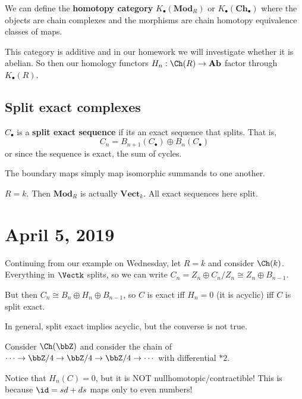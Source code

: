 \documentclass[12pt]{article}
\begin{document}
\begin{rmk}
	We can define the \textbf{homotopy category} $K_\bullet(\mathbf{Mod}_R)$ or $K_\bullet(\mathbf{Ch}_\bullet)$
	where the objects are chain complexes and the morphisms are chain homotopy equivalence classes of maps.

	This category is additive and in our homework we will investigate whether it is abelian. So then 
	our homology functors $H_n:\Ch(R)\to \mathbf{Ab}$ factor through $K_\bullet(R)$.
\end{rmk}

\subsection{Split exact complexes}
\begin{defn}
	$C_\bullet$ is a \textbf{split exact sequence} if its an exact sequence that splits. That is,
	\[C_n=B_{n+1}(C_\bullet)\oplus B_n(C_\bullet)\]
	or since the sequence is exact, the sum of cycles.

	The boundary maps simply map isomorphic summands to one another.
\end{defn}
\begin{ex}
	$R=k$. Then $\mathbf{Mod}_R$ is actually $\mathbf{Vect}_k$. All exact sequences here split.
\end{ex}

\section{April 5, 2019}
\begin{ex}
	Continuing from our example on Wednesday, let $R=k$ and consider $\Ch(k)$. Everything in $\Vectk$ splits, 
	so we can write $C_n=Z_n\oplus C_n/Z_n\cong Z_n\oplus B_{n-1}$.

	But then $C_n\cong B_n\oplus H_n\oplus B_{n-1}$, so $C$ is exact iff $H_n=0$ (it is acyclic)
	iff $C$ is split exact.
\end{ex}
\begin{rmk}
	In general, split exact implies acyclic, but the converse is not true.
\end{rmk}
\begin{ex}
	Consider $\Ch(\bbZ)$ and consider the chain of $\cdots \to\bbZ/4\to\bbZ/4\to\bbZ/4\to\cdots$
	with differential $\ast 2$.

	Notice that $H_n(C)=0$, but it is NOT nullhomotopic/contractible! This is because $\id=sd+ds$ maps
	only to even numbers!
\end{ex}
\end{document}
